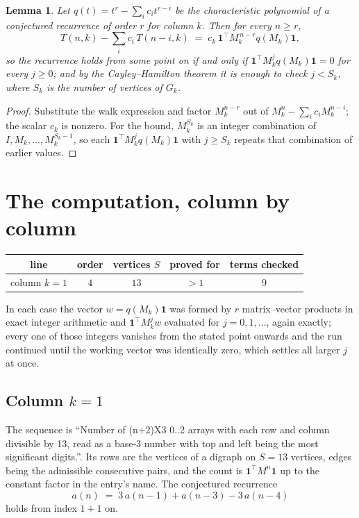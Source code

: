 \documentclass[11pt,a4paper]{article}
\theoremstyle{plain}
\newtheorem{lemma}[theorem]{Lemma}
\theoremstyle{definition}
\begin{document}
\begin{lemma}\label{lem:crit}
Let $q(t)=t^{r}-\sum_i c_it^{r-i}$ be the characteristic polynomial of a conjectured
recurrence of order $r$ for column $k$. Then for every $n\ge r$,
\[
T(n,k)-\sum_i c_i\,T(n-i,k)\;=\;c_k\,\mathbf{1}^{\!\top}M_k^{\,n-r}q(M_k)\mathbf{1},
\]
so the recurrence holds from some point on if and only if
$\mathbf{1}^{\!\top}M_k^{j}q(M_k)\mathbf{1}=0$ for every $j\ge0$; and by the
Cayley--Hamilton theorem it is enough to check $j<S_k$, where $S_k$ is the number of vertices
of $G_k$.
\end{lemma}

\begin{proof}
Substitute the walk expression and factor $M_k^{n-r}$ out of $M_k^{n}-\sum_ic_iM_k^{n-i}$;
the scalar $c_k$ is nonzero. For the bound, $M_k^{S_k}$ is an integer combination of
$I,M_k,\dots,M_k^{S_k-1}$, so each $\mathbf{1}^{\!\top}M_k^{j}q(M_k)\mathbf{1}$ with
$j\ge S_k$ repeats that combination of earlier values.
\end{proof}

\section{The computation, column by column}

\begin{center}
\begin{tabular}{ccccc}
line & order & vertices $S$ & proved for & terms checked \\ \hline
column $k$$=1$ & $4$ & $13$ & $>1$ & $9$ \\
\end{tabular}
\end{center}

In each case the vector $w=q(M_k)\mathbf{1}$ was formed by $r$ matrix--vector products in
exact integer arithmetic and $\mathbf{1}^{\!\top}M_k^{j}w$ evaluated for $j=0,1,\dots$,
again exactly; every one of those integers vanishes from the stated point onwards and the run
continued until the working vector was identically zero, which settles all larger $j$ at once.

\subsection*{Column $k$$=1$}
The sequence is ``Number of (n+2)X3 0..2 arrays with each row and column divisible by 13, read as a base-3 number with top and left being the most significant digits.''. Its rows are the vertices of a digraph on
$S=13$ vertices, edges being the admissible consecutive pairs, and the count is
$\mathbf{1}^{\!\top}M^{n}\mathbf{1}$ up to the constant factor in the entry's name.
The conjectured recurrence
\[
a(n)\;=\;3\,a(n-1) + a(n-3) - 3\,a(n-4)
\]
holds from index $1+1$ on.
\end{document}
